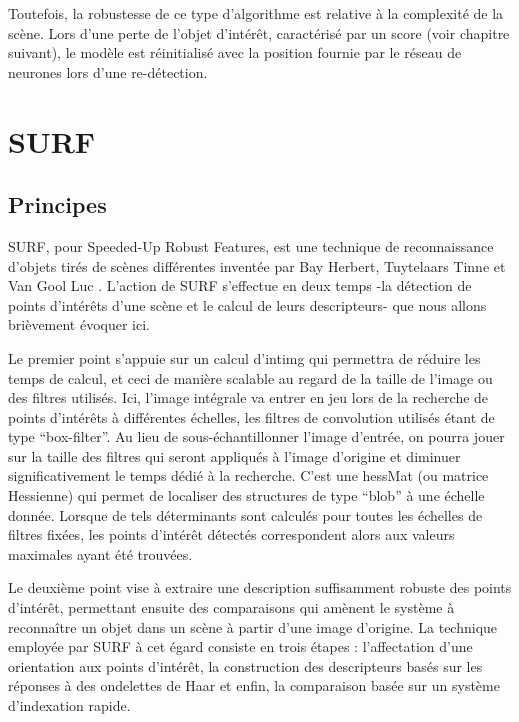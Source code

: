		Toutefois, la robustesse de ce type d'algorithme est relative à la complexité de la scène.
		Lors d'une perte de l'objet d'intérêt, caractérisé par un score (voir chapitre suivant), le modèle est réinitialisé avec la position fournie par le réseau de neurones lors d'une re-détection.
		
      \section{SURF}

	\subsection{Principes}
	
	SURF, pour Speeded-Up Robust Features, est une technique de reconnaissance d'objets tirés de scènes différentes inventée par Bay Herbert, Tuytelaars Tinne et Van Gool Luc \cite{Bib_SURF}.
	L'action de SURF s'effectue en deux temps -la détection de points d'intérêts d'une scène et le calcul de leurs descripteurs-  que nous allons brièvement évoquer ici. 
	
	Le premier point s'appuie sur un calcul d'\gls{intimg} qui permettra de réduire les temps de calcul, et ceci de manière scalable au regard de la taille de l'image ou des filtres utilisés.
	Ici, l'image intégrale va entrer en jeu lors de la recherche de points d'intérêts à différentes échelles, les filtres de convolution utilisés étant de type ``box-filter''. 
	Au lieu de sous-échantillonner l'image d'entrée, on pourra jouer sur la taille des filtres qui seront appliqués à l'image d'origine et diminuer significativement le temps dédié à la recherche.  
	C'est une \gls{hessMat} (ou matrice Hessienne) qui permet de localiser des structures de type ``blob'' à une échelle donnée.
	Lorsque de tels déterminants sont calculés pour toutes les échelles de filtres fixées, les points d'intérêt détectés correspondent alors aux valeurs maximales ayant été trouvées. 
	
	Le deuxième point vise à extraire une description suffisamment robuste des points d'intérêt, permettant ensuite des comparaisons qui amènent le système à reconnaître un objet dans un scène à partir d'une image d'origine.
	La technique employée par SURF à cet égard consiste en trois étapes : 
	l'affectation d'une orientation aux points d'intérêt, la construction des descripteurs basés sur les réponses à des ondelettes de Haar et enfin, la comparaison basée sur un système d'indexation rapide.  
	
